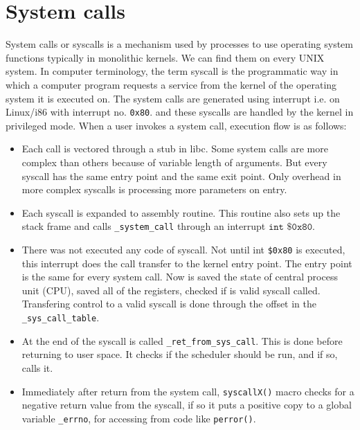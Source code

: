 \section{System calls}
System calls or syscalls is a mechanism used by processes to use operating system functions typically in monolithic kernels.
We can find them on every UNIX system.
In computer terminology, the term syscall is the programmatic way in which a computer program requests a service from the kernel of the operating system it is executed on. The system calls are generated using interrupt i.e. on Linux/i86 with interrupt no. \texttt{0x80}. and these syscalls are handled by the kernel in privileged mode.
When a user invokes a system call, execution flow is as follows:
\begin{itemize}
	\item Each call is vectored through a stub in libc. Some system calls are more complex than others because of variable length of arguments. But every syscall has the same entry point and the same exit point. Only overhead in more complex syscalls is processing more parameters on entry.
	\item Each syscall is expanded to assembly routine. This routine also sets up the stack frame and calls \texttt{\_system\_call\(\)} through an interrupt \( \texttt{int \$0x80} \).
	\item There was not executed any code of syscall. Not until int \texttt{\$0x80} is executed, this interrupt does the call transfer to the kernel entry point. The entry point is the same for every system call. Now is saved the state of central process unit (CPU), saved all of the registers, checked if is valid syscall called. Transfering control to a valid syscall is done through the offset in the \texttt{\_sys\_call\_table}.
	\item At the end of the syscall is called \texttt{\_ret\_from\_sys\_call\(\)}. This is done before returning to user space. It checks if the scheduler should be run, and if so, calls it.
	\item Immediately after return from the system call, \texttt{syscallX()} macro checks for a negative return value from the syscall, if so it puts a positive copy to a global variable \texttt{\_errno}, for accessing from code like \texttt{perror()}.



\end{itemize}

